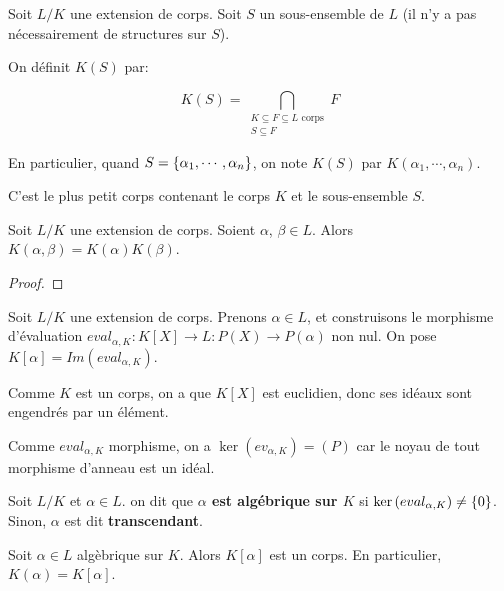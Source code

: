 \begin{definition}
	Soit $L/K$ une extension de corps. Soit $S$ un sous-ensemble de $L$ (il n'y
	a pas nécessairement de structures sur $S$).

	On définit $K(S)$ par:

	\begin{equation*}
		K(S) = \displaystyle \bigcap_{\substack{K \subseteq F \subseteq L
			\text{ corps} \\ S \subseteq F}} F
	\end{equation*}

	En particulier, quand $S = \left\{ \alpha_{1}, \cdots, \alpha_{n} \right\}$, on note
	$K(S)$ par $K(\alpha_{1}, \cdots, \alpha_{n})$.

	C'est le plus petit corps contenant le corps $K$ et le sous-ensemble $S$.
\end{definition}

\begin{proposition}
	Soit $L/K$ une extension de corps. Soient $\alpha$, $\beta \in L$.
	Alors $K(\alpha, \beta) = K(\alpha)K(\beta)$.
\end{proposition}

\ifdefined\outputproof
\begin{proof}

\end{proof}
\fi

Soit $L/K$ une extension de corps. Prenons $\alpha \in L$, et construisons le
morphisme d'évaluation $eval_{\alpha, K} : K[X] \rightarrow L : P(X) \rightarrow
P(\alpha)$ non nul. On pose $K[\alpha] = Im(eval_{\alpha, K})$.

Comme $K$ est un corps, on a que $K[X]$ est euclidien, donc ses idéaux
sont engendrés par un élément.

Comme $eval_{\alpha, K}$ morphisme, on a $\ker{(ev_{\alpha, K})} = (P)$ car
le noyau de tout morphisme d'anneau est un idéal.

\begin{definition} 
	Soit $L/K$ et $\alpha \in L$. on dit que \textbf{$\alpha$ est algébrique sur
	$K$} si $\ker{(eval_{\alpha, K})} \neq \left\{ 0 \right\}$.
	Sinon, $\alpha$ est dit \textbf{transcendant}.
\end{definition}

\begin{proposition}
	Soit $\alpha \in L$ algèbrique sur $K$. Alors $K[\alpha]$ est un corps.
	En particulier, $K(\alpha) = K[\alpha]$.
\end{proposition}

